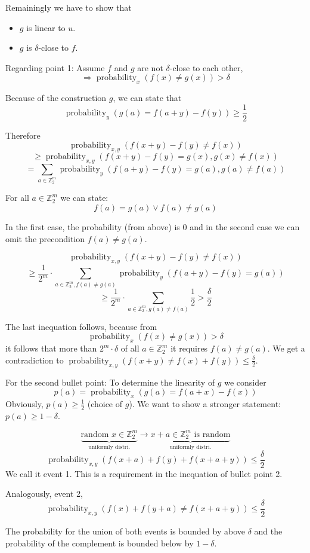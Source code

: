 \documentclass[a4paper]{article}
\DeclareMathOperator{\prop}{probability}
\begin{document}
Remainingly we have to show that
\begin{itemize}
  \item $g$ is linear to $u$.
  \item $g$ is $\delta$-close to $f$.
\end{itemize}

Regarding point 1: Assume $f$ and $g$ are not $\delta$-close to each other,
\[
  \Rightarrow \prop_x(f(x) \neq g(x)) > \delta
\]

Because of the construction $g$, we can state that
\[
  \prop_y (g(a) = f(a + y) - f(y)) \geq \frac12
\]

Therefore
\[
  \prop_{x,y}(f(x+y) - f(y) \neq f(x))
\] \[
  \geq \prop_{x,y}(f(x + y) - f(y) = g(x), g(x) \neq f(x))
\] \[
  = \sum_{a\in\mathbb{Z}_2^m} \prop_y
    (f(a+y) - f(y) = g(a), g(a) \neq f(a))
\]

For all $a \in \mathbb{Z}_2^m$ we can state:
\[
  f(a) = g(a) \lor f(a) \neq g(a)
\]

In the first case, the probability (from above) is $0$ and in the second case
we can omit the precondition $f(a) \neq g(a)$.

\[
  \prop_{x,y}(f(x+y) - f(y) \neq f(x))
\] \[
  \geq \frac{1}{2^m} \cdot \sum_{a\in\mathbb{Z}_2^m,f(a)\neq g(a)}
      \prop_y(f(a+y) - f(y) = g(a))
\] \[
  \geq \frac{1}{2^m} \cdot \sum_{a\in\mathbb{Z}_2^m, g(a) \neq f(a)}
    \frac12 > \frac\delta{2}
\]

The last inequation follows, because from
\[
  \prop_x(f(x) \neq g(x)) > \delta
\]
it follows that more than $2^m \cdot \delta$ of all $a \in \mathbb{Z}_2^m$
it requires $f(a) \neq g(a)$.
We get a contradiction to $\prop_{x,y}(f(x + y) \neq f(x) + f(y)) \leq \frac\delta{2}$.

For the second bullet point: To determine the linearity of $g$ we consider
\[
  p(a) = \prop_x(g(a) = f(a+x) - f(x))
\]
Obviously, $p(a) \geq \frac12$ (choice of $g$). We want to show a stronger
statement: $p(a) \geq 1 - \delta$.

\[
  \underbrace{\text{random } x \in \mathbb{Z}_2^m}_{\text{uniformly distri.}} \rightarrow
    \underbrace{x + a \in \mathbb{Z}_2^m \text{ is random}}_{\text{uniformly distri.}}
\] \[
  \prop_{x,y}(f(x + a) + f(y) + f(x + a + y)) \leq \frac\delta{2}
\]
We call it event 1.
This is a requirement in the inequation of bullet point 2.

Analogously, event 2,
\[
  \prop_{x,y}(f(x) + f(y + a) \neq f(x + a + y)) \leq \frac\delta2
\]

The probability for the union of both events is bounded by above $\delta$
and the probability of the complement is bounded below by $1 - \delta$.
\end{document}
